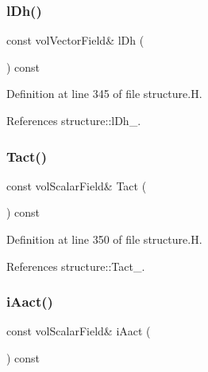 \subsubsection{\texorpdfstring{l\+Dh()}{lDh()}}
{\footnotesize\ttfamily const vol\+Vector\+Field\& l\+Dh (\begin{DoxyParamCaption}{ }\end{DoxyParamCaption}) const\hspace{0.3cm}{\ttfamily [inline]}}



Definition at line 345 of file structure.\+H.



References structure\+::l\+Dh\+\_\+.

\mbox{\label{classFoam_1_1structure_abebe2d39aa018c9e0279a27bf5e201f6}} 
\subsubsection{\texorpdfstring{Tact()}{Tact()}}
{\footnotesize\ttfamily const vol\+Scalar\+Field\& Tact (\begin{DoxyParamCaption}{ }\end{DoxyParamCaption}) const\hspace{0.3cm}{\ttfamily [inline]}}



Definition at line 350 of file structure.\+H.



References structure\+::\+Tact\+\_\+.

\mbox{\label{classFoam_1_1structure_afedf45f11522786f95df7228a3f2d35a}} 
\subsubsection{\texorpdfstring{i\+Aact()}{iAact()}}
{\footnotesize\ttfamily const vol\+Scalar\+Field\& i\+Aact (\begin{DoxyParamCaption}{ }\end{DoxyParamCaption}) const\hspace{0.3cm}{\ttfamily [inline]}}



